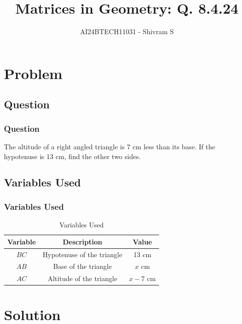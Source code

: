 \documentclass{beamer}
\title{Matrices in Geometry: Q. 8.4.24}
\author{AI24BTECH11031 - Shivram S}
\date{}
\begin{document}
\begin{frame}
    \titlepage
\end{frame}

\begin{frame}
    \tableofcontents
\end{frame}

\section{Problem}
\subsection{Question}
\begin{frame}
    \frametitle{Question}

    The altitude of a right angled triangle is 7 cm less
    than its base. If the hypotenuse is 13 cm, find the
    other two sides.
\end{frame}

\subsection{Variables Used}
\begin{frame}
    \frametitle{Variables Used}

    \begin{table}[h!]
    \centering
    \begin{tabular}[12pt]{ |c| c| c|}
        \hline
        \textbf{Variable} & \textbf{Description} & \textbf{Value}\\
        \hline
        $BC$ & Hypotenuse of the triangle & 13 cm\\
        \hline
        $AB$ & Base of the triangle & $x$ cm\\
        \hline
        $AC$ & Altitude of the triangle & $x - 7$ cm\\
        \hline
    \end{tabular}
    \caption{Variables Used}
    \end{table}
\end{frame}

\section{Solution}
\end{document}
